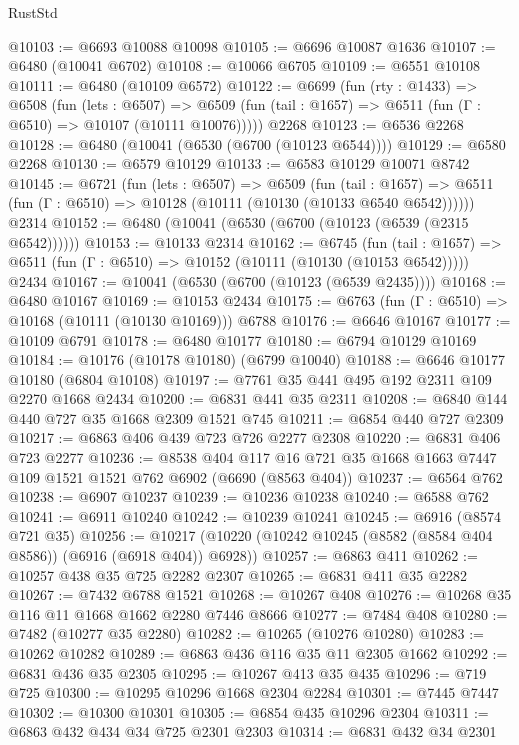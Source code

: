 \begin{lexlean}{RustStd}
\begin{coremodule}
@10103 := @6693 @10088 @10098
@10105 := @6696 @10087 @1636
@10107 := @6480 (@10041 @6702)
@10108 := @10066 @6705
@10109 := @6551 @10108
@10111 := @6480 (@10109 @6572)
@10122 := @6699
    (fun (rty : @1433) =>
    @6508
      (fun (lets : @6507) =>
      @6509 (fun (tail : @1657) => @6511 (fun (Γ : @6510) => @10107 (@10111 @10076)))))
    @2268
@10123 := @6536 @2268
@10128 := @6480 (@10041 (@6530 (@6700 (@10123 @6544))))
@10129 := @6580 @2268
@10130 := @6579 @10129
@10133 := @6583 @10129 @10071 @8742
@10145 := @6721
    (fun (lets : @6507) =>
    @6509
      (fun (tail : @1657) =>
      @6511 (fun (Γ : @6510) => @10128 (@10111 (@10130 (@10133 @6540 @6542))))))
    @2314
@10152 := @6480 (@10041 (@6530 (@6700 (@10123 (@6539 (@2315 @6542))))))
@10153 := @10133 @2314
@10162 := @6745
    (fun (tail : @1657) => @6511 (fun (Γ : @6510) => @10152 (@10111 (@10130 (@10153 @6542)))))
    @2434
@10167 := @10041 (@6530 (@6700 (@10123 (@6539 @2435))))
@10168 := @6480 @10167
@10169 := @10153 @2434
@10175 := @6763 (fun (Γ : @6510) => @10168 (@10111 (@10130 @10169))) @6788
@10176 := @6646 @10167
@10177 := @10109 @6791
@10178 := @6480 @10177
@10180 := @6794 @10129 @10169
@10184 := @10176 (@10178 @10180) (@6799 @10040)
@10188 := @6646 @10177 @10180 (@6804 @10108)
@10197 := @7761 @35 @441 @495 @192 @2311 @109 @2270 @1668 @2434
@10200 := @6831 @441 @35 @2311
@10208 := @6840 @144 @440 @727 @35 @1668 @2309 @1521 @745
@10211 := @6854 @440 @727 @2309
@10217 := @6863 @406 @439 @723 @726 @2277 @2308
@10220 := @6831 @406 @723 @2277
@10236 := @8538
    @404
    @117
    @16
    @721
    @35
    @1668
    @1663
    @7447
    @109
    @1521
    @1521
    @762
    @6902
    (@6690 (@8563 @404))
@10237 := @6564 @762
@10238 := @6907 @10237
@10239 := @10236 @10238
@10240 := @6588 @762
@10241 := @6911 @10240
@10242 := @10239 @10241
@10245 := @6916 (@8574 @721 @35)
@10256 := @10217 (@10220 (@10242 @10245 (@8582 (@8584 @404 @8586)) (@6916 (@6918 @404)) @6928))
@10257 := @6863 @411
@10262 := @10257 @438 @35 @725 @2282 @2307
@10265 := @6831 @411 @35 @2282
@10267 := @7432 @6788 @1521
@10268 := @10267 @408
@10276 := @10268 @35 @116 @11 @1668 @1662 @2280 @7446 @8666
@10277 := @7484 @408
@10280 := @7482 (@10277 @35 @2280)
@10282 := @10265 (@10276 @10280)
@10283 := @10262 @10282
@10289 := @6863 @436 @116 @35 @11 @2305 @1662
@10292 := @6831 @436 @35 @2305
@10295 := @10267 @413 @35 @435
@10296 := @719 @725
@10300 := @10295 @10296 @1668 @2304 @2284
@10301 := @7445 @7447
@10302 := @10300 @10301
@10305 := @6854 @435 @10296 @2304
@10311 := @6863 @432 @434 @34 @725 @2301 @2303
@10314 := @6831 @432 @34 @2301

\end{coremodule}
\end{lexlean}
